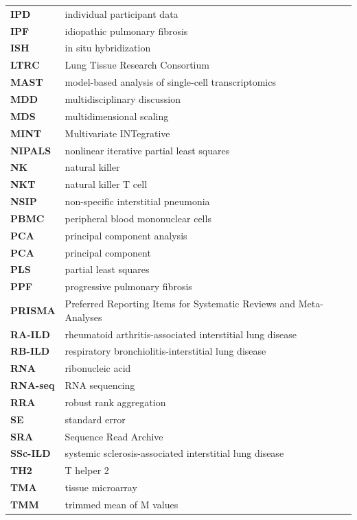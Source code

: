 \documentclass[
]{article}
\begin{document}
\begin{singlespace}
\begin{longtable}{>{}ll}
\textbf{IPD} & individual participant data\\
\textbf{IPF} & idiopathic pulmonary fibrosis\\
\textbf{ISH} & in situ hybridization\\
\addlinespace
\textbf{LTRC} & Lung Tissue Research Consortium\\
\textbf{MAST} & model-based analysis of single-cell transcriptomics\\
\textbf{MDD} & multidisciplinary discussion\\
\textbf{MDS} & multidimensional scaling\\
\textbf{MINT} & Multivariate INTegrative\\
\addlinespace
\textbf{NIPALS} & nonlinear iterative partial least squares\\
\textbf{NK} & natural killer\\
\textbf{NKT} & natural killer T cell\\
\textbf{NSIP} & non-specific interstitial pneumonia\\
\textbf{PBMC} & peripheral blood mononuclear cells\\
\addlinespace
\textbf{PCA} & principal component analysis\\
\textbf{PCA} & principal component\\
\textbf{PLS} & partial least squares\\
\textbf{PPF} & progressive pulmonary fibrosis\\
\textbf{PRISMA} & Preferred Reporting Items for Systematic Reviews and Meta-Analyses\\
\addlinespace
\textbf{RA-ILD} & rheumatoid arthritis-associated interstitial lung disease\\
\textbf{RB-ILD} & respiratory bronchiolitis-interstitial lung disease\\
\textbf{RNA} & ribonucleic acid\\
\textbf{RNA-seq} & RNA sequencing\\
\textbf{RRA} & robust rank aggregation\\
\addlinespace
\textbf{SE} & standard error\\
\textbf{SRA} & Sequence Read Archive\\
\textbf{SSc-ILD} & systemic sclerosis-associated interstitial lung disease\\
\textbf{TH2} & T helper 2\\
\textbf{TMA} & tissue microarray\\
\addlinespace
\textbf{TMM} & trimmed mean of M values\\

\end{longtable}
\end{singlespace}
\end{document}
